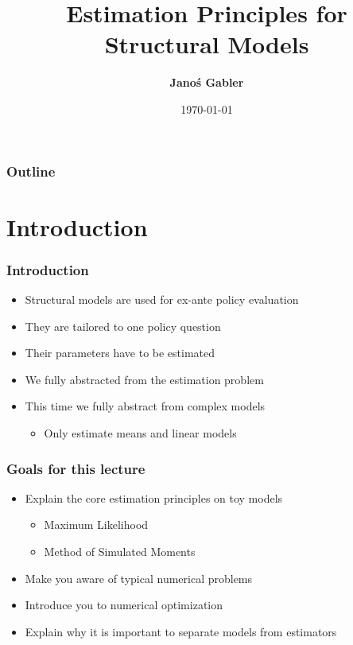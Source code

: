 \documentclass[11pt]{beamer}
\author[Janoś Gabler]
{
{\bf Janoś Gabler}}
\begin{document}
\title{Estimation Principles for Structural Models}
\date{\today}

\begin{frame}
    \maketitle
    \note{~}
\end{frame}

\begin{frame}\frametitle{Outline}
  \hspace{1cm}\begin{minipage}{\textwidth}
    \tableofcontents[hideallsubsections]
  \end{minipage}
\end{frame}


\section{Introduction}


\begin{frame}[c]\frametitle{Introduction}
    \begin{itemize}
      \item Structural models are used for ex-ante policy evaluation
      \item They are tailored to one policy question
      \item Their parameters have to be estimated
      \item We fully abstracted from the estimation problem
      \item This time we fully abstract from complex models
      \begin{itemize}
          \item Only estimate means and linear models
      \end{itemize}
    \end{itemize}
\end{frame}


\begin{frame}[c]\frametitle{Goals for this lecture}
    \begin{itemize}
      \item Explain the core estimation principles on toy models
      \begin{itemize}
        \item Maximum Likelihood
        \item Method of Simulated Moments
      \end{itemize}
      \item Make you aware of typical numerical problems
      \item Introduce you to numerical optimization
      \item Explain why it is important to separate models from estimators
    \end{itemize}
\end{frame}
\end{document}
